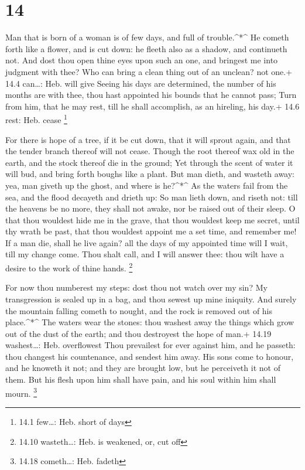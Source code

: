 \hypertarget{section-13}{%
\section{14}\label{section-13}}

 Man that is born of a woman is of few days, and full of
trouble.\^{}*\^{}  He cometh forth like a flower, and is cut
down: he fleeth also as a shadow, and continueth not.  And
dost thou open thine eyes upon such an one, and bringest me into
judgment with thee?  Who can bring a clean thing out of an
unclean? not one.+ 14.4 can\ldots: Heb. will give  Seeing
his days are determined, the number of his months are with thee, thou
hast appointed his bounds that he cannot pass;  Turn from
him, that he may rest, till he shall accomplish, as an hireling, his
day.+ 14.6 rest: Heb. cease \footnote{14.1 few\ldots: Heb. short of days}

 For there is hope of a tree, if it be cut down, that it
will sprout again, and that the tender branch thereof will not cease.
 Though the root thereof wax old in the earth, and the stock
thereof die in the ground;  Yet through the scent of water
it will bud, and bring forth boughs like a plant.  But man
dieth, and wasteth away: yea, man giveth up the ghost, and where is
he?\^{}*\^{}  As the waters fail from the sea, and the
flood decayeth and drieth up:  So man lieth down, and
riseth not: till the heavens be no more, they shall not awake, nor be
raised out of their sleep.  O that thou wouldest hide me in
the grave, that thou wouldest keep me secret, until thy wrath be past,
that thou wouldest appoint me a set time, and remember me! 
If a man die, shall he live again? all the days of my appointed time
will I wait, till my change come.  Thou shalt call, and I
will answer thee: thou wilt have a desire to the work of thine hands.
\footnote{14.10 wasteth\ldots: Heb. is weakened, or, cut off}

 For now thou numberest my steps: dost thou not watch over
my sin?  My transgression is sealed up in a bag, and thou
sewest up mine iniquity.  And surely the mountain falling
cometh to nought, and the rock is removed out of his place.\^{}*\^{}
 The waters wear the stones: thou washest away the things
which grow out of the dust of the earth; and thou destroyest the hope of
man.+ 14.19 washest\ldots: Heb. overflowest  Thou
prevailest for ever against him, and he passeth: thou changest his
countenance, and sendest him away.  His sons come to
honour, and he knoweth it not; and they are brought low, but he
perceiveth it not of them.  But his flesh upon him shall
have pain, and his soul within him shall mourn. \footnote{14.18
  cometh\ldots: Heb. fadeth}

